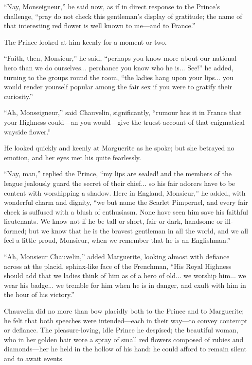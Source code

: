 \documentclass[paper=5.5in:8.5in,BCOR=7mm,twoside,DIV=calc,12pt,usegeometry,chapterprefix,endperiod,headings=big]{scrbook}
\begin{document}
\enquote{Nay, Monseigneur,} he said now, as if in direct response to the Prince's challenge, \enquote{pray do not check this gentleman's display of gratitude; the name of that interesting red flower is well known to me---and to France.}

The Prince looked at him keenly for a moment or two.

\enquote{Faith, then, Monsieur,} he said, \enquote{perhaps you know more about our national hero than we do ourselves... perchance you know who he is... See!} he added, turning to the groups round the room, \enquote{the ladies hang upon your lips... you would render yourself popular among the fair sex if you were to gratify their curiosity.}

\enquote{Ah, Monseigneur,} said Chauvelin, significantly, \enquote{rumour has it in France that your Highness could---an you would---give the truest account of that enigmatical wayside flower.}

He looked quickly and keenly at Marguerite as he spoke; but she betrayed no emotion, and her eyes met his quite fearlessly.

\enquote{Nay, man,} replied the Prince, \enquote{my lips are sealed! and the members of the league jealously guard the secret of their chief... so his fair adorers have to be content with worshipping a shadow. Here in England, Monsieur,} he added, with wonderful charm and dignity, \enquote{we but name the Scarlet Pimpernel, and every fair cheek is suffused with a blush of enthusiasm. None have seen him save his faithful lieutenants. We know not if he be tall or short, fair or dark, handsome or ill-formed; but we know that he is the bravest gentleman in all the world, and we all feel a little proud, Monsieur, when we remember that he is an Englishman.}

\enquote{Ah, Monsieur Chauvelin,} added Marguerite, looking almost with defiance across at the placid, sphinx-like face of the Frenchman, \enquote{His Royal Highness should add that we ladies think of him as of a hero of old... we worship him... we wear his badge... we tremble for him when he is in danger, and exult with him in the hour of his victory.}

Chauvelin did no more than bow placidly both to the Prince and to Marguerite; he felt that both speeches were intended---each in their way---to convey contempt or defiance. The pleasure-loving, idle Prince he despised; the beautiful woman, who in her golden hair wore a spray of small red flowers composed of rubies and diamonds---her he held in the hollow of his hand: he could afford to remain silent and to await events.
\end{document}
